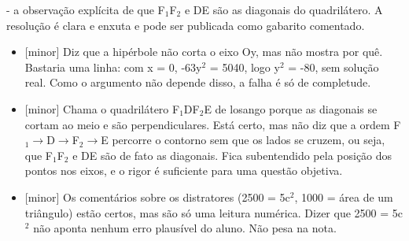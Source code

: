 \documentclass{article}%
\begin{document}
{-} a observação explícita de que F$_{1}$F$_{2}$ e DE são as diagonais do quadrilátero.\newline%
\newline%
A resolução é clara e enxuta e pode ser publicada como gabarito comentado.%
\begin{itemize}%
\item%
{[}minor{]} Diz que a hipérbole não corta o eixo Oy, mas não mostra por quê. Bastaria uma linha: com x = 0, -63y$^2$ = 5040, logo y$^2$ = -80, sem solução real. Como o argumento não depende disso, a falha é só de completude.%
\item%
{[}minor{]} Chama o quadrilátero F$_{1}$DF$_{2}$E de losango porque as diagonais se cortam ao meio e são perpendiculares. Está certo, mas não diz que a ordem F$_{1}$$\to$D$\to$F$_{2}$$\to$E percorre o contorno sem que os lados se cruzem, ou seja, que F$_{1}$F$_{2}$ e DE são de fato as diagonais. Fica subentendido pela posição dos pontos nos eixos, e o rigor é suficiente para uma questão objetiva.%
\item%
{[}minor{]} Os comentários sobre os distratores (2500 = 5c$^2$, 1000 = área de um triângulo) estão certos, mas são só uma leitura numérica. Dizer que 2500 = 5c$^2$ não aponta nenhum erro plausível do aluno. Não pesa na nota.%
\end{itemize}%
\end{document}
